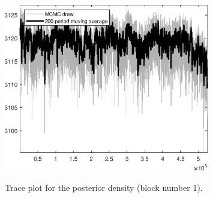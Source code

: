 \begin{figure}[H]
\centering
  \includegraphics[width=0.8\textwidth]{BRS_growth_KPR/graphs/TracePlot_Posterior_blck_1}\\
    \caption{Trace plot for the posterior density (block number 1).}
\end{figure}
